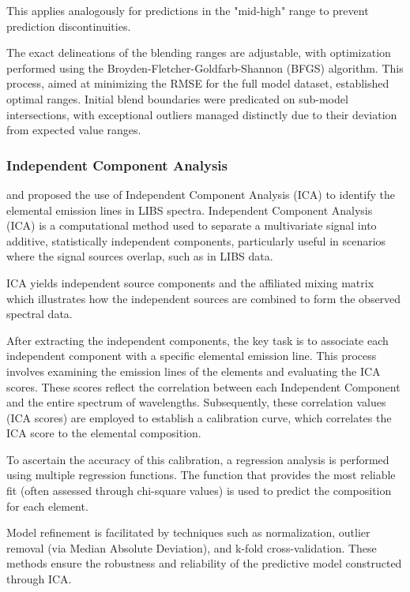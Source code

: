 This applies analogously for predictions in the "mid-high" range to prevent prediction discontinuities.

The exact delineations of the blending ranges are adjustable, with optimization performed using the Broyden-Fletcher-Goldfarb-Shannon (BFGS) algorithm. This process, aimed at minimizing the RMSE for the full model dataset, established optimal ranges. Initial blend boundaries were predicated on sub-model intersections, with exceptional outliers managed distinctly due to their deviation from expected value ranges.

\subsubsection{Independent Component Analysis}\label{sec:ica}
\citet{cleggRecalibrationMarsScience2017} and \citet{forniIndependentComponentAnalysis2013} proposed the use of Independent Component Analysis (ICA) to identify the elemental emission lines in LIBS spectra. Independent Component Analysis (ICA) is a computational method used to separate a multivariate signal into additive, statistically independent components, particularly useful in scenarios where the signal sources overlap, such as in LIBS data.

ICA yields independent source components and the affiliated mixing matrix which illustrates how the independent sources are combined to form the observed spectral data.

After extracting the independent components, the key task is to associate each independent component with a specific elemental emission line.
This process involves examining the emission lines of the elements and evaluating the ICA scores.
These scores reflect the correlation between each Independent Component and the entire spectrum of wavelengths.
Subsequently, these correlation values (ICA scores) are employed to establish a calibration curve, which correlates the ICA score to the elemental composition.

To ascertain the accuracy of this calibration, a regression analysis is performed using multiple regression functions. The function that provides the most reliable fit (often assessed through chi-square values) is used to predict the composition for each element.

Model refinement is facilitated by techniques such as normalization, outlier removal (via Median Absolute Deviation), and k-fold cross-validation. These methods ensure the robustness and reliability of the predictive model constructed through ICA.

